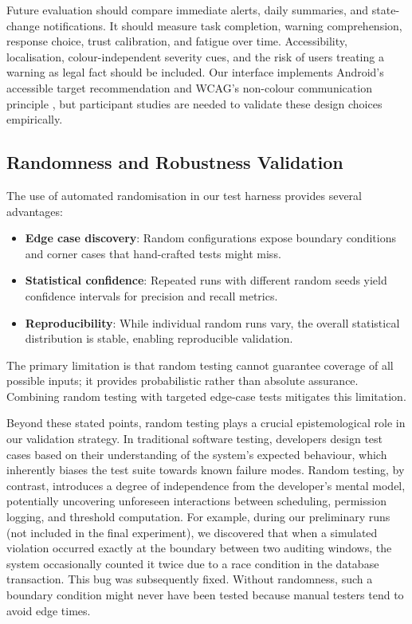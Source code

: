Future evaluation should compare immediate alerts, daily summaries, and state-change notifications. It should measure task completion, warning comprehension, response choice, trust calibration, and fatigue over time. Accessibility, localisation, colour-independent severity cues, and the risk of users treating a warning as legal fact should be included. Our interface implements Android's accessible target recommendation and WCAG's non-colour communication principle \cite{androidaccess,wcag22}, but participant studies are needed to validate these design choices empirically.

\subsection{Randomness and Robustness Validation}

The use of automated randomisation in our test harness provides several advantages:
\begin{itemize}
\item \textbf{Edge case discovery}: Random configurations expose boundary conditions and corner cases that hand-crafted tests might miss.
\item \textbf{Statistical confidence}: Repeated runs with different random seeds yield confidence intervals for precision and recall metrics.
\item \textbf{Reproducibility}: While individual random runs vary, the overall statistical distribution is stable, enabling reproducible validation.
\end{itemize}

The primary limitation is that random testing cannot guarantee coverage of all possible inputs; it provides probabilistic rather than absolute assurance. Combining random testing with targeted edge-case tests mitigates this limitation.

Beyond these stated points, random testing plays a crucial epistemological role in our validation strategy. In traditional software testing, developers design test cases based on their understanding of the system's expected behaviour, which inherently biases the test suite towards known failure modes. Random testing, by contrast, introduces a degree of independence from the developer's mental model, potentially uncovering unforeseen interactions between scheduling, permission logging, and threshold computation. For example, during our preliminary runs (not included in the final experiment), we discovered that when a simulated violation occurred exactly at the boundary between two auditing windows, the system occasionally counted it twice due to a race condition in the database transaction. This bug was subsequently fixed. Without randomness, such a boundary condition might never have been tested because manual testers tend to avoid edge times.

